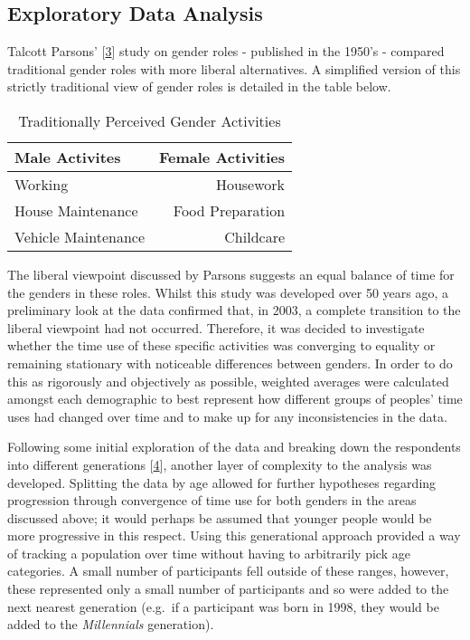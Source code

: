\documentclass[11pt,]{article}
\begin{document}
\hypertarget{exploratory-data-analysis-1}{%
\subsection{Exploratory Data
Analysis}\label{exploratory-data-analysis-1}}

Talcott Parsons' {[}\protect\hyperlink{ref-10.2307ux2f2085686}{3}{]}
study on gender roles - published in the 1950's - compared traditional
gender roles with more liberal alternatives. A simplified version of
this strictly traditional view of gender roles is detailed in the table
below.

\begin{table}[H]

\caption{\label{tab:unnamed-chunk-2}Traditionally Perceived Gender Activities}
\centering
\begin{tabular}[t]{lr}
\toprule
Male Activites & Female Activities\\
\midrule
Working & Housework\\
House Maintenance & Food Preparation\\
Vehicle Maintenance & Childcare\\
\bottomrule
\end{tabular}
\end{table}

The liberal viewpoint discussed by Parsons suggests an equal balance of
time for the genders in these roles. Whilst this study was developed
over 50 years ago, a preliminary look at the data confirmed that, in
2003, a complete transition to the liberal viewpoint had not occurred.
Therefore, it was decided to investigate whether the time use of these
specific activities was converging to equality or remaining stationary
with noticeable differences between genders. In order to do this as
rigorously and objectively as possible, weighted averages were
calculated amongst each demographic to best represent how different
groups of peoples' time uses had changed over time and to make up for
any inconsistencies in the data.

Following some initial exploration of the data and breaking down the
respondents into different generations
{[}\protect\hyperlink{ref-generations}{4}{]}, another layer of
complexity to the analysis was developed. Splitting the data by age
allowed for further hypotheses regarding progression through convergence
of time use for both genders in the areas discussed above; it would
perhaps be assumed that younger people would be more progressive in this
respect. Using this generational approach provided a way of tracking a
population over time without having to arbitrarily pick age categories.
A small number of participants fell outside of these ranges, however,
these represented only a small number of participants and so were added
to the next nearest generation (e.g.~if a participant was born in 1998,
they would be added to the \emph{Millennials} generation).
\end{document}
